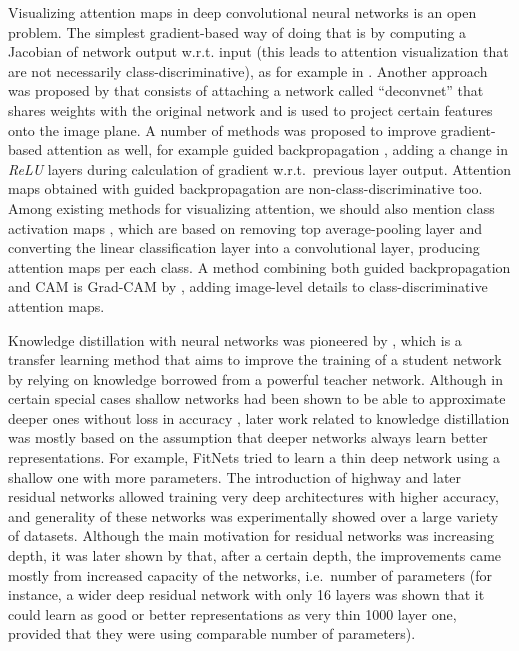 \documentclass{article} \usepackage{iclr2017_conference}
\begin{document}
Visualizing attention maps in deep convolutional neural networks is an open problem.
The simplest gradient-based way of doing that is by computing a Jacobian of network output w.r.t. input (this leads to attention visualization that are not necessarily class-discriminative), as for example in \cite{simonyan14}. Another approach was proposed by \cite{zeiler14} that consists of attaching a network called ``deconvnet'' that shares weights with the  original network and is used  to project certain features onto the image plane. A number of methods was proposed to improve gradient-based attention as well, for example guided backpropagation \cite{SprDosBroRied15}, adding a change in \textit{ReLU} layers during calculation of gradient w.r.t.\ previous layer output. Attention maps obtained with guided backpropagation are non-class-discriminative too. Among existing   methods for visualizing attention, we should also mention class activation maps \cite{zhou2016cvpr}, which are based on removing top average-pooling layer and converting the linear classification layer into a convolutional layer, producing attention maps per each class. A method combining both guided backpropagation and CAM is Grad-CAM by \cite{gradcam}, adding image-level details to class-discriminative attention maps.

Knowledge distillation with neural networks was pioneered by \cite{KD, caruana2006}, which is a transfer learning method that aims to  improve the training of a student network by relying on knowledge borrowed from a powerful teacher network. Although in certain special cases shallow networks had been  shown to be able to approximate deeper ones without loss in accuracy \cite{caruana2014}, later work related to knowledge distillation was mostly based on the assumption that deeper networks always learn better representations. For example, FitNets \cite{Romero-et-al-TR2014} tried to learn a thin deep network using a shallow one with more parameters. The introduction of highway \cite{highway} and later residual networks \cite{he2015deep} allowed training very deep architectures with higher accuracy, and generality of these networks was experimentally showed over a large variety of datasets. Although the main motivation for residual networks was increasing depth, it was later shown by \cite{Zagoruyko2016WRN} that, after a certain depth, the improvements came mostly from increased capacity of the networks, i.e.\ number of parameters (for instance, a wider deep residual network with only 16 layers was shown that it could learn as good or better representations as very thin 1000 layer one, provided that they were using  comparable number of parameters).
\end{document}
